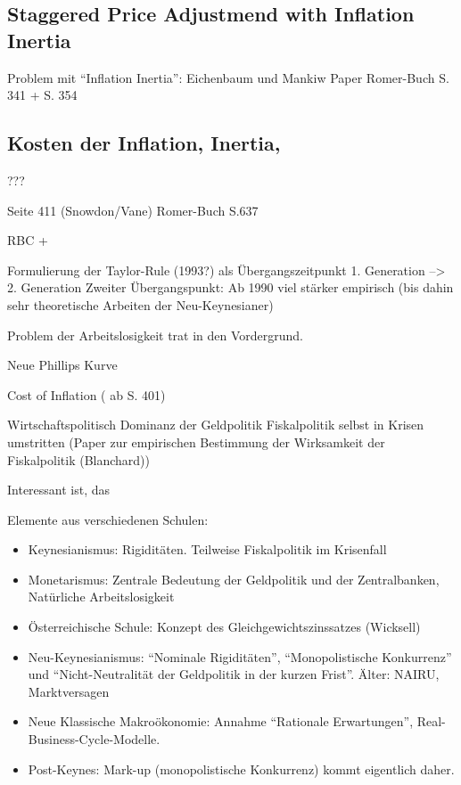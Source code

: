 \subsection{Staggered Price Adjustmend with Inflation Inertia}

Problem mit "`Inflation Inertia"': Eichenbaum und Mankiw Paper
Romer-Buch S. 341 + S. 354

\subsection{Kosten der Inflation, Inertia, }
???

Seite 411 (Snowdon/Vane)
Romer-Buch S.637




RBC + \textcite{RomerDavid1990}

Formulierung der Taylor-Rule (1993?) als  Übergangszeitpunkt 1. Generation --> 2. Generation
Zweiter Übergangspunkt: Ab 1990 viel stärker empirisch (bis dahin sehr theoretische Arbeiten der Neu-Keynesianer)

Problem der Arbeitslosigkeit trat in den Vordergrund.



Neue Phillips Kurve

Cost of Inflation (\textcite{Snowdon2005} ab S. 401) 


Wirtschaftspolitisch Dominanz der Geldpolitik
Fiskalpolitik selbst in Krisen umstritten (Paper zur empirischen Bestimmung der Wirksamkeit der Fiskalpolitik (Blanchard))



Interessant ist, das

Elemente aus verschiedenen Schulen:
\begin{itemize}
	\item Keynesianismus: Rigiditäten. Teilweise Fiskalpolitik im Krisenfall
	\item Monetarismus: Zentrale Bedeutung der Geldpolitik und der Zentralbanken, Natürliche Arbeitslosigkeit
	\item Österreichische Schule: Konzept des Gleichgewichtszinssatzes (Wicksell)
	\item Neu-Keynesianismus: "`Nominale Rigiditäten"', "`Monopolistische Konkurrenz"' und "`Nicht-Neutralität der Geldpolitik in der kurzen Frist"'. Älter: NAIRU, Marktversagen
	\item Neue Klassische Makroökonomie: Annahme "`Rationale Erwartungen"', Real-Business-Cycle-Modelle.
	\item Post-Keynes: Mark-up (monopolistische Konkurrenz) kommt eigentlich daher.
\end{itemize}



